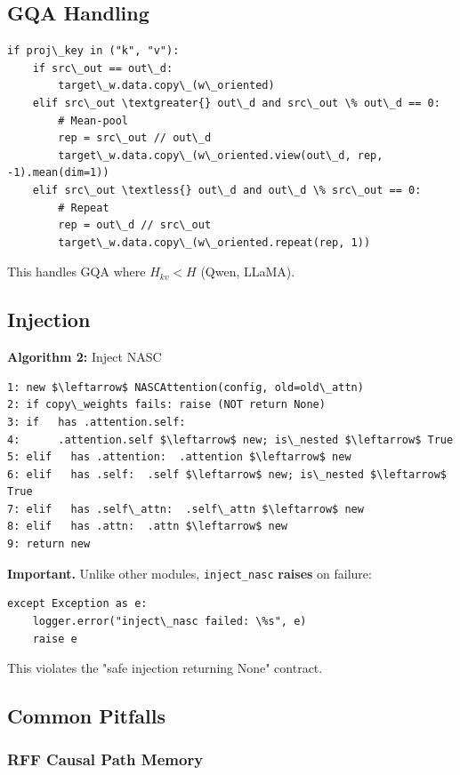 \subsection{GQA Handling}

\begin{lstlisting}
if proj\_key in ("k", "v"):
    if src\_out == out\_d:
        target\_w.data.copy\_(w\_oriented)
    elif src\_out \textgreater{} out\_d and src\_out \% out\_d == 0:
        # Mean-pool
        rep = src\_out // out\_d
        target\_w.data.copy\_(w\_oriented.view(out\_d, rep, -1).mean(dim=1))
    elif src\_out \textless{} out\_d and out\_d \% src\_out == 0:
        # Repeat
        rep = out\_d // src\_out
        target\_w.data.copy\_(w\_oriented.repeat(rep, 1))
\end{lstlisting}

This handles GQA where $H_{kv} < H$ (Qwen, LLaMA).

\subsection{Injection}

\textbf{Algorithm 2:} Inject NASC
\begin{lstlisting}
1: new $\leftarrow$ NASCAttention(config, old=old\_attn)
2: if copy\_weights fails: raise (NOT return None)
3: if   has .attention.self:
4:      .attention.self $\leftarrow$ new; is\_nested $\leftarrow$ True
5: elif   has .attention:  .attention $\leftarrow$ new
6: elif   has .self:  .self $\leftarrow$ new; is\_nested $\leftarrow$ True
7: elif   has .self\_attn:  .self\_attn $\leftarrow$ new
8: elif   has .attn:  .attn $\leftarrow$ new
9: return new
\end{lstlisting}

\textbf{Important.} Unlike other modules, \texttt{inject\_nasc} \textbf{raises} on failure:

\begin{lstlisting}
except Exception as e:
    logger.error("inject\_nasc failed: \%s", e)
    raise e
\end{lstlisting}

This violates the "safe injection returning None" contract.

\subsection{Common Pitfalls}

\subsubsection{RFF Causal Path Memory}

